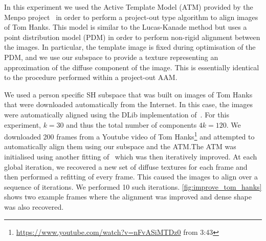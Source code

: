 In this experiment we used the Active Template Model (ATM) provided by the Menpo
project~\cite{menpo14} in order to perform a project-out type algorithm to align
images of Tom Hanks. This model is similar to the Lucas-Kanade
\cite{lucas1981iterative} method but uses a point distribution model (PDM) in order to
perform non-rigid alignment between the images. In particular, the template
image is fixed during optimisation of the PDM, and we use our subspace to
provide a texture representing an approximation of the diffuse component of the
image. This is essentially identical to the procedure performed within a
project-out AAM.\@

We used a person specific SH subspace that was built on images of Tom Hanks that
were downloaded automatically from the Internet. In this case, the images were
automatically aligned using the DLib implementation of~\cite{kazemi2014one}. For
this experiment, $k = 30$ and thus the total number of components $4k = 120$. We
downloaded 200 frames from a Youtube video of Tom
Hanks\footnote{\url{https://www.youtube.com/watch?v=nFvASiMTDz0} from 3:43} and
attempted to automatically align them using our subspace and the ATM.\@ The ATM
was initialised using another fitting of~\cite{kazemi2014one} which was then
iteratively improved. At each global iteration, we recovered a new set of
diffuse textures for each frame and then performed a refitting of every frame.
This caused the images to align over a sequence of iterations. We performed 10
such iterations. \cref{fig:improve_tom_hanks} shows two example frames
where the alignment was improved and dense shape was also recovered.

